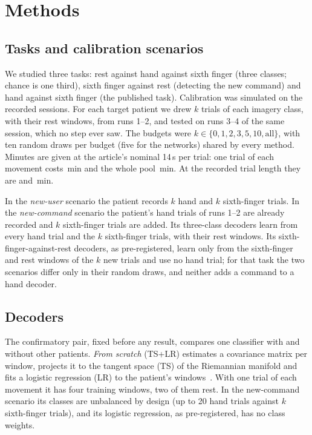 \section{Methods}
\label{sec:methods}

\subsection{Tasks and calibration scenarios}
\label{sec:scenarios}
We studied three tasks: rest against hand against sixth finger (three
classes; chance is one third), sixth finger against rest (detecting the new
command) and hand against sixth finger (the published task). Calibration was
simulated on the recorded sessions. For each target patient we drew $k$
trials of each imagery class, with their rest windows, from runs 1--2, and
tested on runs 3--4 of the same session, which no step ever saw. The budgets
were $k \in \{0, 1, 2, 3, 5, 10, \text{all}\}$, with ten random draws per
budget (five for the networks) shared by every method. Minutes are given at
the article's nominal 14\,s per trial: one trial of each movement costs
\rqTwoMinutesKOne\,min and the whole pool \rqTwoMinutesKAll\,min. At the
recorded trial length they are \rqTwoMinutesRecordedKOne{} and
\rqTwoMinutesRecordedKAll\,min.

In the \emph{new-user} scenario the patient records $k$ hand and $k$
sixth-finger trials. In the \emph{new-command} scenario the patient's hand
trials of runs 1--2 are already recorded and $k$ sixth-finger trials are
added. Its three-class decoders learn from every hand trial and the $k$
sixth-finger trials, with their rest windows. Its sixth-finger-against-rest
decoders, as pre-registered, learn only from the sixth-finger and rest
windows of the $k$ new trials and use no hand trial; for that task the two
scenarios differ only in their random draws, and neither adds a command to a
hand decoder.

\subsection{Decoders}
The confirmatory pair, fixed before any result, compares one classifier with
and without other patients. \emph{From scratch} (TS+LR) estimates a covariance
matrix per window, projects it to the tangent space (TS) of the Riemannian
manifold and fits a logistic regression (LR) to the patient's
windows~\cite{barachant2012}. With one trial of each movement it has four
training windows, two of them rest. In the new-command scenario its classes
are unbalanced by design (up to 20 hand trials against $k$ sixth-finger
trials), and its logistic regression, as pre-registered, has no class
weights.

